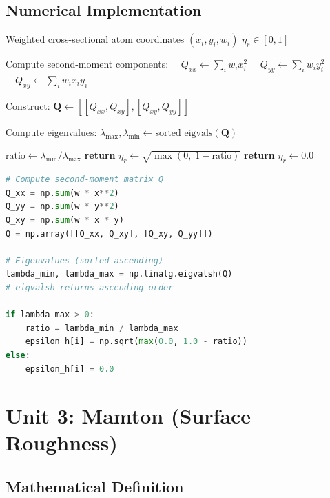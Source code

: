 \subsection{Numerical Implementation}

\begin{algorithm}
\caption{Compute Shambhian ($\eta_r$)}\label{alg:shambhian}
\begin{algorithmic}[1]
    \Require Weighted cross-sectional atom coordinates $(x_i, y_i, w_i)$
    \Ensure $\eta_r \in [0, 1]$
    
    \State Compute second-moment components:
    \State $\quad Q_{xx} \gets \sum_i w_i x_i^2$
    \State $\quad Q_{yy} \gets \sum_i w_i y_i^2$
    \State $\quad Q_{xy} \gets \sum_i w_i x_i y_i$
    
    \State Construct: $\mathbf{Q} \gets [[Q_{xx}, Q_{xy}], [Q_{xy}, Q_{yy}]]$
    
    \State Compute eigenvalues: $\lambda_{\max}, \lambda_{\min} \gets \text{sorted eigvals}(\mathbf{Q})$
    
        \State $\text{ratio} \gets \lambda_{\min} / \lambda_{\max}$
        \State \textbf{return} $\eta_r \gets \sqrt{\max(0,\; 1 - \text{ratio})}$
    \Else
        \State \textbf{return} $\eta_r \gets 0.0$
    \EndIf
\end{algorithmic}
\end{algorithm}

\begin{lstlisting}[language=Python, caption=Shambhian computation (from sht\_dna\_analysis.py)]
# Compute second-moment matrix Q
Q_xx = np.sum(w * x**2)
Q_yy = np.sum(w * y**2)
Q_xy = np.sum(w * x * y)
Q = np.array([[Q_xx, Q_xy], [Q_xy, Q_yy]])

# Eigenvalues (sorted ascending)
lambda_min, lambda_max = np.linalg.eigvalsh(Q)
# eigvalsh returns ascending order

if lambda_max > 0:
    ratio = lambda_min / lambda_max
    epsilon_h[i] = np.sqrt(max(0.0, 1.0 - ratio))
else:
    epsilon_h[i] = 0.0
\end{lstlisting}


\section{Unit 3: Mamton (Surface Roughness)}

\subsection{Mathematical Definition}

